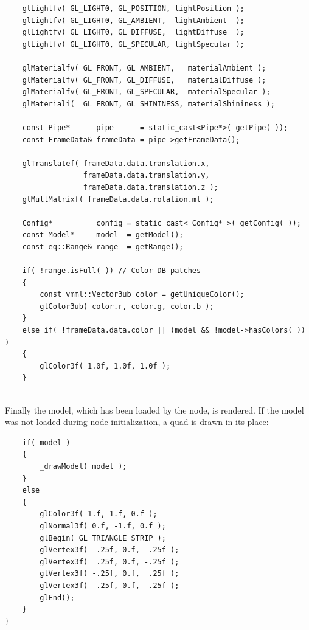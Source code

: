 \documentclass[10pt,a4]{scrartcl}
\begin{document}
{\footnotesize\begin{lstlisting}
    glLightfv( GL_LIGHT0, GL_POSITION, lightPosition );
    glLightfv( GL_LIGHT0, GL_AMBIENT,  lightAmbient  );
    glLightfv( GL_LIGHT0, GL_DIFFUSE,  lightDiffuse  );
    glLightfv( GL_LIGHT0, GL_SPECULAR, lightSpecular );

    glMaterialfv( GL_FRONT, GL_AMBIENT,   materialAmbient );
    glMaterialfv( GL_FRONT, GL_DIFFUSE,   materialDiffuse );
    glMaterialfv( GL_FRONT, GL_SPECULAR,  materialSpecular );
    glMateriali(  GL_FRONT, GL_SHININESS, materialShininess );

    const Pipe*      pipe      = static_cast<Pipe*>( getPipe( ));
    const FrameData& frameData = pipe->getFrameData();

    glTranslatef( frameData.data.translation.x,
                  frameData.data.translation.y,
                  frameData.data.translation.z );
    glMultMatrixf( frameData.data.rotation.ml );

    Config*          config = static_cast< Config* >( getConfig( ));
    const Model*     model  = getModel();
    const eq::Range& range  = getRange();

    if( !range.isFull( )) // Color DB-patches
    {
        const vmml::Vector3ub color = getUniqueColor();
        glColor3ub( color.r, color.g, color.b );
    }
    else if( !frameData.data.color || (model && !model->hasColors( )) )
    {
        glColor3f( 1.0f, 1.0f, 1.0f );
    }
    
\end{lstlisting}}

Finally the model, which has been loaded by the node, is rendered. If
the model was not loaded during node initialization, a quad is drawn in
its place:

{\footnotesize\begin{lstlisting}
    if( model )
    {
        _drawModel( model );
    }
    else
    {
        glColor3f( 1.f, 1.f, 0.f );
        glNormal3f( 0.f, -1.f, 0.f );
        glBegin( GL_TRIANGLE_STRIP );
        glVertex3f(  .25f, 0.f,  .25f );
        glVertex3f(  .25f, 0.f, -.25f );
        glVertex3f( -.25f, 0.f,  .25f );
        glVertex3f( -.25f, 0.f, -.25f );
        glEnd();
    }
}
\end{lstlisting}}
\end{document}
